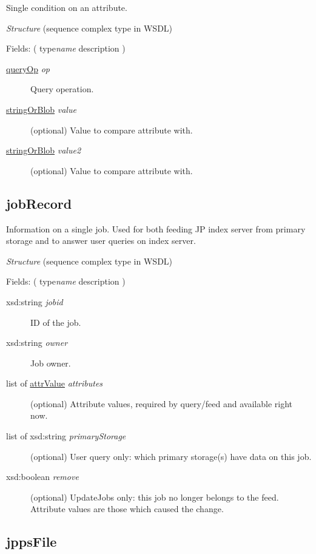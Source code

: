 Single condition on an attribute.

{\em{Structure}} (sequence complex type in WSDL)

Fields: ( type{\ttfamily\itshape{{name}}} description )

\begin{description}
\item[{\hyperlink{type:queryOp}{queryOp} {\ttfamily\itshape{{op}}}}]\null{}
Query operation.
\item[{\hyperlink{type:stringOrBlob}{stringOrBlob} {\ttfamily\itshape{{value}}}}]\null{}
(optional) Value to compare attribute with.
\item[{\hyperlink{type:stringOrBlob}{stringOrBlob} {\ttfamily\itshape{{value2}}}}]\null{}
(optional) Value to compare attribute with.
\end{description}
\noindent \subsection{jobRecord}
\label{type:jobRecord}\hypertarget{type:jobRecord}{}%

Information on a single job. Used for both feeding JP index server from primary storage and to answer user queries on index server.

{\em{Structure}} (sequence complex type in WSDL)

Fields: ( type{\ttfamily\itshape{{name}}} description )

\begin{description}
\item[{xsd:string {\ttfamily\itshape{{jobid}}}}]\null{}
ID of the job.
\item[{xsd:string {\ttfamily\itshape{{owner}}}}]\null{}
Job owner.
\item[{list of \hyperlink{type:attrValue}{attrValue} {\ttfamily\itshape{{attributes}}}}]\null{}
(optional) Attribute values, required by query/feed and available right now.
\item[{list of xsd:string {\ttfamily\itshape{{primaryStorage}}}}]\null{}
(optional) User query only: which primary storage(s) have data on this job.
\item[{xsd:boolean {\ttfamily\itshape{{remove}}}}]\null{}
(optional) UpdateJobs only: this job no longer belongs to the feed. Attribute values are those which caused the change.
\end{description}
\noindent \subsection{jppsFile}
\label{type:jppsFile}\hypertarget{type:jppsFile}{}%

